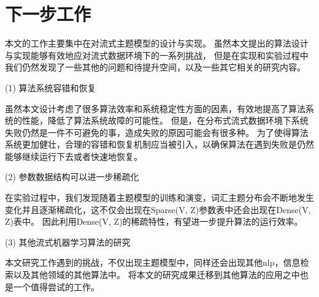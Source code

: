 \section{下一步工作}
本文的工作主要集中在对流式主题模型的设计与实现。
虽然本文提出的算法设计与实现能够有效地应对流式数据环境下的一系列挑战，
但是在实现和实验过程中我们仍然发现了一些其他的问题和待提升空间，以及一些其它相关的研究内容。

(1) 算法系统容错和恢复

虽然本文设计考虑了很多算法效率和系统稳定性方面的因素，有效地提高了算法系统的性能，降低了算法系统故障的可能性。
但是，在分布式流式数据环境下系统失败仍然是一件不可避免的事，造成失败的原因可能会有很多种。
为了使得算法系统更加健壮，合理的容错和恢复机制应当被引入，以确保算法在遇到失败是仍然能够继续运行下去或者快速地恢复。

(2) 参数数据结构可以进一步稀疏化

在实验过程中，我们发现随着主题模型的训练和演变，词汇主题分布会不断地发生变化并且逐渐稀疏化，这不仅会出现在Sparse(V, Z)参数表中还会出现在Dense(V, Z)表中。
因此利用Dense(V, Z)的稀疏特性，有望进一步提升算法的运行效率。


(3) 其他流式机器学习算法的研究

本文研究工作遇到的挑战，不仅出现主题模型中，同样还会出现其他nlp，信息检索以及其他领域的其他算法中。
将本文的研究成果迁移到其他算法的应用之中也是一个值得尝试的工作。
